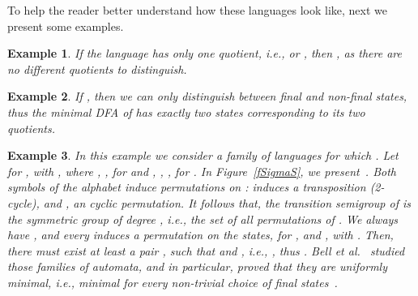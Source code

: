 \documentclass{article}
\newtheorem{example}{Example}
\newcommand{\dfa}{DFA\xspace}
\begin{document}
To help the reader better understand  how these languages look like, next we present 
some examples.

\begin{example}
\label{ex:singleton}
 If the language  has only one quotient, i.e.,  or
 , then , as there are no
 different quotients to distinguish. 
\end{example}

\begin{example}
\label{ex:epsilon}
If , then we can only distinguish between final 
and non-final states, thus the minimal \dfa of  has exactly two states 
corresponding to its  two quotients.
\end{example}

\begin{example}
\label{ex:symmerysg}
In this example we consider a family of languages  for which .
Let  for ,  with
,  
where , 
, for  and 
, ,  , for .  
In Figure~\ref{fSigmaS}, we present~.   
Both symbols of the alphabet induce permutations on :  induces
a transposition (2-cycle), and  , an  cyclic permutation. It
follows that, the transition semigroup of   
is the symmetric group  of degree , i.e., the set of all
permutations of .  
We always have  , and  
 every  induces a permutation on the states, 
for  ,  and  ,
with .  
Then, there must exist at least a pair , such that  and
, i.e., 
 ,  thus . 
Bell et al.~\cite{bell14:_symmet_group_and_quotien_compl}
studied those families of automata,  
and in particular, proved that they are uniformly minimal, i.e.,
minimal for every non-trivial choice of final
states~\cite{restivo12:_graph_theor_approac_to_autom_minim}.  
\end{example}
\end{document}
